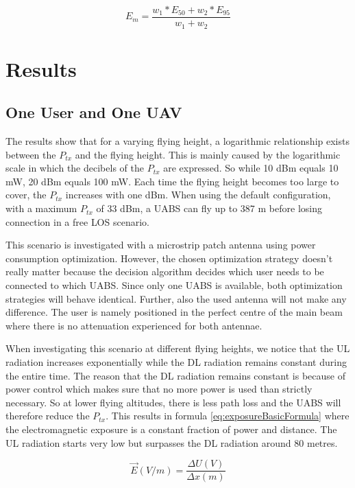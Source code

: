 \documentclass[twocolumn]{phdsymp} %
\begin{document}
\begin{equation} 
E_m = \frac{w_1 * E_{50} + w_2 * E_{95}}{w_1 + w_2}
\label{eq:em}
\end{equation}

\section{Results}
\subsection{One User and One \gls{UAV}}

The  results show that for a varying flying height, a logarithmic relationship exists between the $P_{tx}$ and the flying height. 
This is mainly caused by the logarithmic 
scale in which the decibels of the $P_{tx}$ are expressed. So while 10 dBm equals 10 mW, 20 dBm equals 100 mW. 
Each time the flying height becomes too large to cover, the 
$P_{tx}$ increases with one dBm. 
When using the default configuration, with a maximum $P_{tx}$ of 33 dBm,
a \gls{UABS} can fly up to 387 m before losing connection in a free \gls{LOS} scenario.

This scenario is investigated with a microstrip patch antenna using power consumption optimization. 
 However, the chosen optimization strategy doesn't really matter because the decision 
 algorithm decides which user 
needs to be connected to which \gls{UABS}. Since only one \gls{UABS} is available, both optimization strategies will behave identical.
Further, also the used antenna will not make any difference.
The user is namely positioned in the perfect centre of the main beam where there is 
no attenuation experienced for both antennae.

When investigating this scenario at different flying heights, we notice 
that the \gls{UL} radiation 
increases exponentially while 
the \gls{DL} radiation remains constant during the entire time. The reason that the \gls{DL} radiation
remains constant is because of power control which makes sure that no more power is used than strictly necessary. 
So at lower flying altitudes, there is less path loss and the \gls{UABS} 
will therefore reduce the $P_{tx}$. This results in formula \ref{eq:exposureBasicFormula} where the electromagnetic exposure is a constant fraction of power and distance.
The \gls{UL} radiation starts very low but surpasses the \gls{DL} radiation 
around 80 metres.

\begin{equation}
\vec{E} (V/m) = \frac{\Delta U (V) }{\Delta x (m)}
\label{eq:exposureBasicFormula}
\end{equation}
\end{document}
